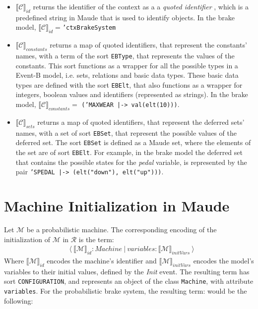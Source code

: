 \begin{itemize}
    \item $\llbracket \mathscr{C} \rrbracket_{id}$ returns the identifier of the context as a a \textit{quoted identifier} \cite{MaudeManual}, which is a predefined string in Maude that is used to identify objects. In the brake model, $\llbracket \mathscr{C} \rrbracket_{id} = $\texttt{'ctxBrakeSystem}
    \item $\llbracket \mathscr{C} \rrbracket_{constants}$ returns a map of quoted identifiers, that represent the constants' names, with a term of the sort \texttt{EBType}, that represents the values of the constants. This sort functions as a wrapper for all the possible types in a Event-B model, i.e. sets, relations and basic data types. These basic data types are defined with the sort \texttt{EBElt}, that also functions as a wrapper for integers, boolean values and identifiers (represented as strings).  In the brake model, $\llbracket \mathscr{C} \rrbracket_{constants} = $ \texttt{('MAXWEAR |-> val(elt(10)))}.
    
    \item $\llbracket \mathscr{C} \rrbracket_{sets}$ returns a map of quoted identifiers, that represent the deferred sets' names, with a set of sort \texttt{EBSet}, that represent the possible values of the deferred set. The sort \texttt{EBSet} is defined as a Maude set, where the elements of the set are of sort \texttt{EBElt}. For example, in the brake model the deferred set that contains the possible states for the \textit{pedal} variable, is represented by the pair \texttt{'SPEDAL |-> (elt("down"), elt("up")))}.
\end{itemize}

\section{Machine Initialization in Maude}
Let $\mathscr{M}$ be a probabilistic machine. The corresponding encoding of the initialization of $\mathscr{M}$ in $\mathscr{R}$ is the term:
    \begin{align*}
    & \langle \ \llbracket \mathscr{M} \rrbracket_{id} : Machine \ | \ variables: \llbracket \mathscr{M} \rrbracket_{initVars} \ \rangle 
    \end{align*}
Where $\llbracket \mathscr{M} \rrbracket_{id}$ encodes the machine's identifier and $\llbracket \mathscr{M} \rrbracket_{initVars}$ encodes the model's variables to their initial values, defined by the \textit{Init} event. The resulting term has sort \texttt{CONFIGURATION}, and represents an object of the class \texttt{Machine}, with attribute \texttt{variables}. For the probabilistic brake system, the resulting term: would be the following:

